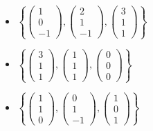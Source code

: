 \documentclass[letterpaper,11pt,english]{sphinxmanual}
\begin{document}
\begin{itemize}
\item {} 
\(\left\{\begin{pmatrix}1\\0\\-1\end{pmatrix}, \begin{pmatrix}2\\1\\-1\end{pmatrix}, \begin{pmatrix}3\\1\\1\end{pmatrix}\right\}\)

\item {} 
\(\left\{\begin{pmatrix}3\\1\\1\end{pmatrix}, \begin{pmatrix}1\\1\\1\end{pmatrix}, \begin{pmatrix}0\\0\\0\end{pmatrix}\right\}\)

\item {} 
\(\left\{\begin{pmatrix}1\\1\\0\end{pmatrix}, \begin{pmatrix}0\\1\\-1\end{pmatrix}, \begin{pmatrix}1\\0\\1\end{pmatrix}\right\}\)

\end{itemize}









\end{document}
